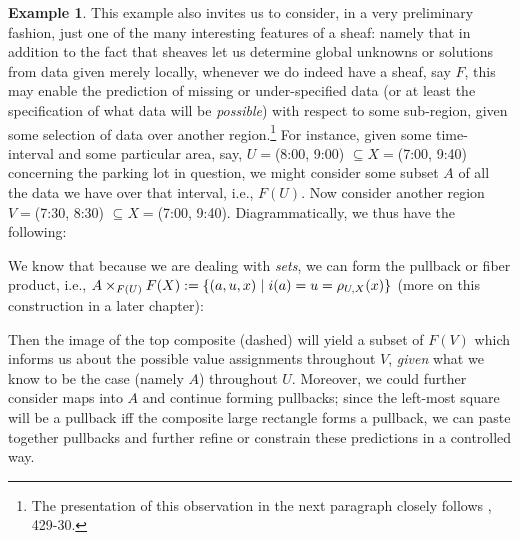 \documentclass[11pt]{book}
\theoremstyle{definition}
\newtheorem{example}{Example}[section]
\theoremstyle{definition}
\theoremstyle{definition}
\theoremstyle{theorem}
\theoremstyle{definition}
\begin{document}
\begin{example}
	This example also invites us to consider, in a very preliminary fashion, just one of the many interesting features of a sheaf: namely that in addition to the fact that sheaves let us determine global unknowns or solutions from data given merely locally, whenever we do indeed have a sheaf, say $F$, this may enable the prediction of missing or under-specified data (or at least the specification of what data will be \textit{possible}) with respect to some sub-region, given some selection of data over another region.\footnote{The presentation of this observation in the next paragraph closely follows \cite{spivak_category_2014}, 429-30.} For instance, given some time-interval and some particular area, say, $U = $(8:00, 9:00) $\subseteq  X = $(7:00, 9:40) concerning the parking lot in question, we might consider some subset $A$ of all the data we have over that interval, i.e., $F(U)$. Now consider another region $V = $(7:30, 8:30) $\subseteq  X = $(7:00, 9:40). Diagrammatically, we thus have the following: 
	\begin{center}  
	\end{center}  
	We know that because we are dealing with \textit{sets}, we can form the pullback or fiber product, i.e., $A \times_{F(U)} F(X) := \{(a,u,x) \hspace*{0.3em}| \hspace*{0.3em} i(a) = u = \rho_{U,X}(x) \}$ (more on this construction in a later chapter):
	\begin{center}  
	\end{center}     
	Then the image of the top composite (dashed) will yield a subset of $F(V)$ which informs us about the possible value assignments throughout $V$, \textit{given} what we know to be the case (namely $A$) throughout $U$. Moreover, we could further consider maps into $A$ and continue forming pullbacks; since the left-most square will be a pullback iff the composite large rectangle forms a pullback, we can paste together pullbacks and further refine or constrain these predictions in a controlled way.
\end{example}
\end{document}

